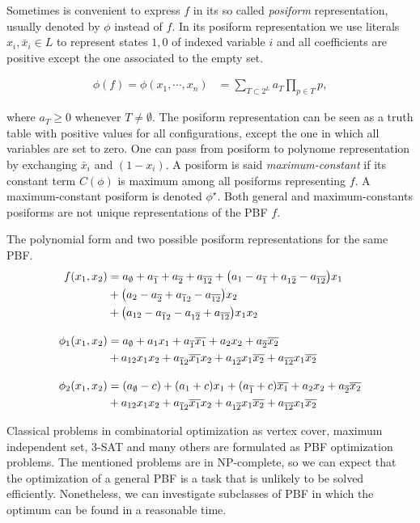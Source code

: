 Sometimes is convenient to express $f$ in its so called \emph{posiform} representation, usually denoted by $\phi$ instead of $f$. In its posiform representation we use literals $x_i,\bar{x}_i \in L$  to represent states $1,0$ of indexed variable $i$ and all coefficients are positive except the one associated to the empty set.

\begin{align}
	\phi(f) = \phi(x_1,\cdots,x_n) &= \sum_{T \subset 2^{L}}a_T{\prod_{p \in T}{p}},
\end{align}

where $a_T \geq 0$ whenever $T\neq \emptyset$. The posiform representation can be seen as a truth table with positive values for all configurations, except the one in which all variables are set to zero. One can pass from posiform to polynome representation by exchanging $\bar{x}_i$ and $(1-x_i)$. A posiform is said \emph{maximum-constant}  if its constant term $C(\phi)$ is maximum among all posiforms representing $f$. A maximum-constant posiform is denoted $\phi^{\star}$. Both general and maximum-constants posiforms are not unique representations of the PBF $f$.

\begin{example}The polynomial form and two possible posiform representations for the same PBF.
\begin{align*}
	f(x_1,x_2) &= a_{\emptyset} + a_{\overline{1}} + a_{\overline{2}} + a_{\overline{12}} + \big(a_1 - a_{\overline{1}} + a_{1{\overline{2}}} - a_{\overline{12}}\big)x_1 \\
	&+ \big(a_{2} - a_{\overline{2}} + a_{{\overline{1}}2} - a_{{\overline{12}}}\big)x_2\\ 
	&+ \big(a_{12} - a_{{\overline{1}}2} - a_{1{\overline{2}}} + a_{{\overline{12}}}\big)x_1x_2 \\[1em]
	\phi_1(x_1,x_2) &= a_{\emptyset} + a_1x_1 + a_{\overline{1}}{\overline{x_1}} + a_2x_2 + a_{\overline{2}}{\overline{x_2}} \\ 
			&+ a_{12}x_1x_2 + a_{{\overline{1}}2}{\overline{x_1}}x_2 + a_{1{\overline{2}}}x_1{\overline{x_2}} + a_{{\overline{12}}}x_1{\overline{x_2}} \\[1em]			
	\phi_2(x_1,x_2) &= (a_{\emptyset}-c) + (a_1+c)x_1 + (a_{\overline{1}}+c){\overline{x_1}} + a_2x_2 + a_{\overline{2}}{\overline{x_2}} \\ 
			&+ a_{12}x_1x_2 + a_{{\overline{1}}2}{\overline{x_1}}x_2 + a_{1{\overline{2}}}x_1{\overline{x_2}} + a_{{\overline{12}}}x_1{\overline{x_2}} 	
\end{align*}
\end{example}

Classical problems in combinatorial optimization as vertex cover, maximum independent set, $3$-SAT and many others are formulated as PBF optimization problems. The mentioned problems are in NP-complete, so we can expect that the optimization of a general PBF is a task that is unlikely to be solved efficiently. Nonetheless, we can investigate subclasses of PBF in which the optimum can be found in a reasonable time.

